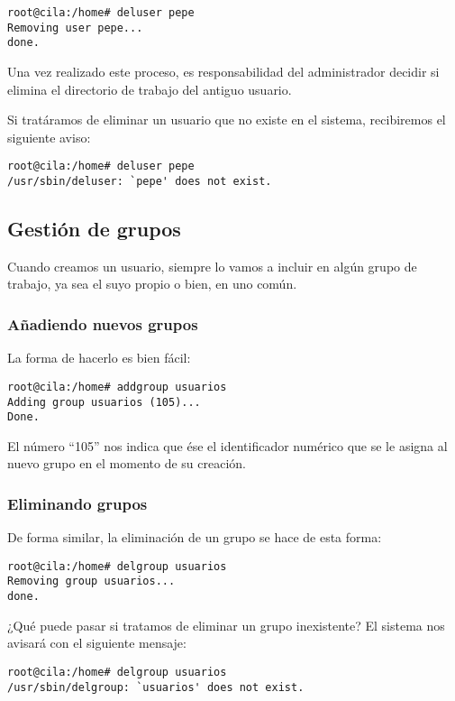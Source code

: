 \begin{verbatim}
root@cila:/home# deluser pepe
Removing user pepe...
done.
\end{verbatim}

Una vez  realizado este proceso, es  responsabilidad del administrador
decidir si elimina el directorio de trabajo del antiguo usuario.

Si tratáramos  de eliminar  un usuario  que no  existe en  el sistema,
recibiremos el siguiente aviso:

\begin{verbatim}
root@cila:/home# deluser pepe
/usr/sbin/deluser: `pepe' does not exist.
\end{verbatim}


\subsection{Gestión de grupos}
Cuando creamos un  usuario, siempre lo vamos a incluir  en algún grupo
de trabajo, ya sea el suyo propio o bien, en uno común.

\subsubsection{Añadiendo nuevos grupos}

La forma de hacerlo es bien fácil:

\begin{verbatim}
root@cila:/home# addgroup usuarios
Adding group usuarios (105)...
Done.
\end{verbatim}

El número ``105'' nos indica que  ése el identificador numérico que se
le asigna al nuevo grupo en el momento de su creación.

\subsubsection{Eliminando grupos}
De forma similar, la eliminación de un grupo se hace de esta forma:

\begin{verbatim}
root@cila:/home# delgroup usuarios
Removing group usuarios...
done.
\end{verbatim}

¿Qué  puede pasar  si tratamos  de eliminar  un grupo  inexistente? El
sistema nos avisará con el siguiente mensaje:

\begin{verbatim}
root@cila:/home# delgroup usuarios
/usr/sbin/delgroup: `usuarios' does not exist.
\end{verbatim}

